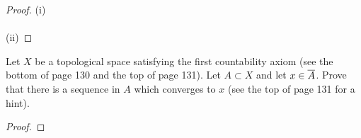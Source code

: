 \begin{proof}
(i)
\\\\
(ii)
\end{proof}
\newpage
\begin{problem}[G]
Let $X$ be a topological space satisfying the first countability
axiom (see the bottom of page 130 and the top of page 131). Let
$A\subset X$ and let $x\in\overline{A}$. Prove that there is a
sequence in $A$ which converges to $x$ (see the top of page 131
for a hint).
\end{problem}
\begin{proof}
\end{proof}



